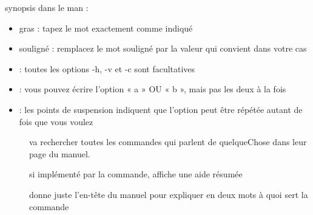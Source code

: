 \documentclass[letterpaper,10pt,french]{sphinxmanual}
\begin{document}
synopsis dans le man :
\begin{itemize}
\item {} 
gras : tapez le mot exactement comme indiqué

\item {} 
souligné : remplacez le mot souligné par la valeur qui convient dans votre cas

\item {} 
\sphinxcode{\sphinxupquote{{[}-hvc{]}}} : toutes les options -h, -v et -c sont facultatives

\item {} 
 : vous pouvez écrire l’option « a » OU « b », mais pas les deux à la fois

\item {} 
 : les points de suspension indiquent que l’option peut être répétée autant de fois que vous voulez

\end{itemize}
\begin{description}
\item[{}] \leavevmode
va rechercher toutes les commandes qui parlent de quelqueChose dans leur page du manuel.

\item[{}] \leavevmode
si implémenté par la commande, affiche une aide résumée

\item[{}] \leavevmode
donne juste l’en-tête du manuel pour expliquer en deux mots à quoi sert la commande

\end{description}
\end{document}
